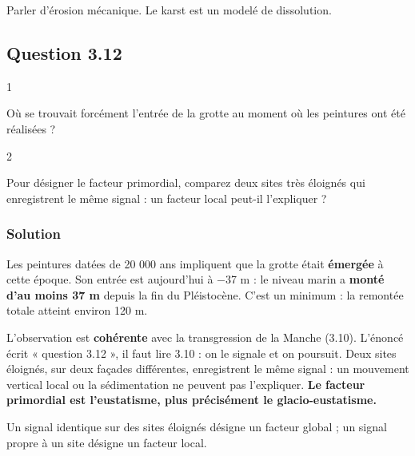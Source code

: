 \documentclass[11pt,a4paper]{article}
\begin{document}
\begin{piege}

Parler d'érosion mécanique. Le karst est un modelé de dissolution.

\end{piege}

\hypertarget{question-3.12}{%
\subsection{Question 3.12}\label{question-3.12}}

\begin{indication}{1}

Où se trouvait forcément l'entrée de la grotte au moment où les peintures ont été réalisées ?

\end{indication}

\begin{indication}{2}

Pour désigner le facteur primordial, comparez deux sites très éloignés qui enregistrent le même signal : un facteur local peut-il l'expliquer ?

\end{indication}

\hypertarget{solution-39}{%
\subsubsection{Solution}\label{solution-39}}

Les peintures datées de 20 000 ans impliquent que la grotte était \textbf{émergée} à cette époque. Son entrée est aujourd'hui à −37 m : le niveau marin a \textbf{monté d'au moins 37 m} depuis la fin du Pléistocène. C'est un minimum : la remontée totale atteint environ 120 m.

L'observation est \textbf{cohérente} avec la transgression de la Manche (3.10). L'énoncé écrit « question 3.12 », il faut lire 3.10 : on le signale et on poursuit. Deux sites éloignés, sur deux façades différentes, enregistrent le même signal : un mouvement vertical local ou la sédimentation ne peuvent pas l'expliquer. \textbf{Le facteur primordial est l'eustatisme, plus précisément le glacio-eustatisme.}

\begin{methode}

Un signal identique sur des sites éloignés désigne un facteur global ; un signal propre à un site désigne un facteur local.

\end{methode}
\end{document}

